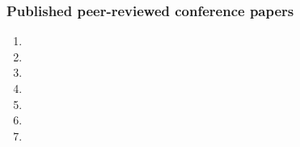 \subsubsection{Published peer-reviewed conference papers}
\begin{enumerate}
	\item {}
	\item {}
	\item {}
    \item {}
	\item {}
	\item {}
	\item {}
\end{enumerate}

